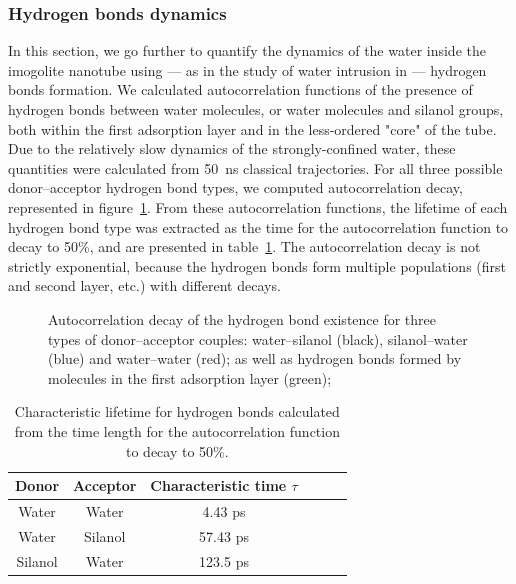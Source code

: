 \documentclass[thesis]{subfiles}
\begin{document}
\subsubsection{Hydrogen bonds dynamics}

In this section, we go further to quantify the dynamics of the water inside the
imogolite nanotube using --- as in the study of water intrusion in  ---
hydrogen bonds formation. We calculated autocorrelation functions of the
presence of hydrogen bonds between water molecules, or water molecules and
silanol groups, both within the first adsorption layer and in the less-ordered
"core" of the tube. Due to the relatively slow dynamics of the strongly-confined
water, these quantities were calculated from \SI{50}{ns} classical trajectories.
For all three possible donor--acceptor hydrogen bond types, we computed
autocorrelation decay, represented in
figure~\ref{fig:imogolite:hbonds:lifetime}. From these autocorrelation
functions, the lifetime of each hydrogen bond type was extracted as the time for
the autocorrelation function to decay to 50\%, and are presented in
table~\ref{tab:imogolite:hbonds:lifetime}. The autocorrelation decay is not
strictly exponential, because the hydrogen bonds form multiple populations
(first and second layer, etc.) with different decays.

\begin{figure}[ht]
    \centering
    
    \caption{Autocorrelation decay of the hydrogen bond existence for three types
    of donor--acceptor couples: water--silanol (black), silanol--water (blue) and
    water--water (red); as well as hydrogen bonds formed by molecules in the
    first adsorption layer (green);}
    \label{fig:imogolite:hbonds:lifetime}
\end{figure}

\begin{table}[ht]
    \centering
    \begin{tabular}{c c c c c c}
        \toprule
        Donor & Acceptor & Characteristic time $\tau$ \\
        \midrule
        Water & Water & 4.43 ps \\
        Water & Silanol & 57.43 ps\\
        Silanol & Water & 123.5 ps \\
        \bottomrule
    \end{tabular}
    \caption{Characteristic lifetime for hydrogen bonds calculated from the time
    length for the autocorrelation function to decay to 50\%.}
    \label{tab:imogolite:hbonds:lifetime}
\end{table}
\end{document}

